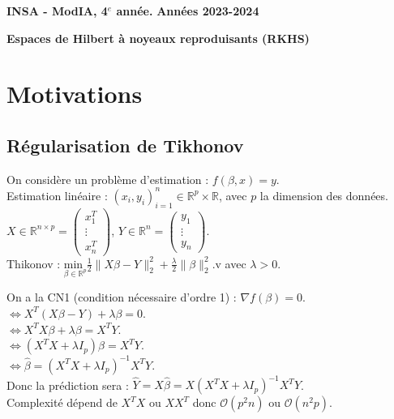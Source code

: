 \documentclass[12pt,a4paper]{article}
\newcommand{\entete}{
    \noindent\textbf{INSA - ModIA, 4$^e$ année.}
    \hfill \textbf{Années 2023-2024}
    
    \begin{center}
        \textbf{\LARGE Espaces de Hilbert à noyeaux reproduisants (RKHS)}
    \end{center}
}
\begin{document}
\entete

\vspace{0.5cm}

\section{Motivations}

\subsection{Régularisation de Tikhonov}

On considère un problème d'estimation : $f(\beta, x) = y$. \\

Estimation linéaire : $(x_i, y_i)_{i=1}^n \in \mathbb{R}^p \times \mathbb{R}$, avec $p$ la dimension des données. \\

$X \in \mathbb{R}^{n \times p} = \begin{pmatrix}
    x_1^T \\
    \vdots \\
    x_n^T
\end{pmatrix}$, $Y \in \mathbb{R}^n = \begin{pmatrix}
    y_1 \\
    \vdots \\
    y_n
\end{pmatrix}$. \\




Thikonov : $\underset{\beta \in \mathbb{R}^p}{\text{min }} \frac{1}{2} \lVert X\beta - Y \rVert^2_2 + \frac{\lambda}{2} \lVert \beta \rVert^2_2$.v avec $\lambda > 0$.

On a la CN1 (condition nécessaire d'ordre 1) : $\nabla f(\beta) = 0$. \\
$\Leftrightarrow X^T(X\beta - Y) + \lambda \beta = 0$. \\
$\Leftrightarrow X^TX\beta + \lambda \beta = X^TY$. \\
$\Leftrightarrow (X^TX + \lambda I_p)\beta = X^TY$. \\
$\Leftrightarrow \hat{\beta} = (X^TX + \lambda I_p)^{-1}X^TY$. \\


Donc la prédiction sera : $\hat{Y} = X\hat{\beta} = X(X^TX + \lambda I_p)^{-1}X^TY$. \\

Complexité dépend de $X^TX$ ou $XX^T$ donc $\mathcal{O}(p^2n)$ ou $\mathcal{O}(n^2p)$.\\
\end{document}
